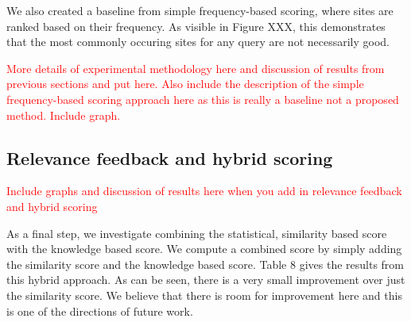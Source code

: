 \documentclass[pdfpagelabels=false,plainpages=true]{acm_proc_article-sp}
\begin{document}
We also created a baseline from simple frequency-based scoring, where
sites are ranked based on their frequency. As visible in Figure XXX, this demonstrates that the
most commonly occuring sites for any query are not necessarily good. 

\textcolor{red}{More details of experimental methodology here and discussion
  of results from previous sections and put here. Also include the description
  of the simple frequency-based scoring approach here as this is really a baseline
  not a proposed method. Include graph.}  

\subsection{Relevance feedback and hybrid scoring}

\textcolor{red}{Include graphs and discussion of results here when you add in
  relevance feedback and hybrid scoring}

As a final step, we investigate combining the statistical, similarity based
score with the knowledge based score. We compute a combined score by simply
adding the similarity score and the knowledge based score. Table 8 gives the
results from this hybrid approach. As can be seen, there is a very small
improvement over just the similarity score. We believe that there is room for
improvement here and this is one of the directions of future work. 



\end{document}
